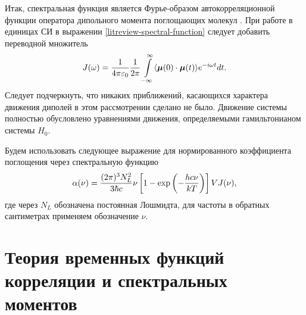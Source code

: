Итак, спектральная функция является Фурье-образом автокорреляционной функции оператора дипольного момента поглощающих молекул \cite{gordon1968}. При работе в единицах СИ в выражении \eqref{litreview-spectral-function} следует добавить переводной множитель
\begin{gather}
    J(\omega) = \frac{1}{4\pi \varepsilon_0} \frac{1}{2\pi} \int\limits_{-\infty}^\infty \langle  \boldsymbol{\mu}(0) \cdot \boldsymbol{\mu}(t)  \rangle e^{-i \omega t} dt. \label{litreview-spectral-function} 
\end{gather}
Следует подчеркнуть, что никаких приближений, касающихся характера движения диполей в этом рассмотрении сделано не было. Движение системы полностью обусловлено уравнениями движения, определяемыми гамильтонианом системы $\hat{H}_0$. \par
Будем использовать следующее выражение для нормированного коэффициента поглощения через спектральную функцию 
\begin{gather}
    \alpha(\nu) = \frac{(2 \pi)^3 N_L^2}{3 \hbar c} \nu \left[ 1 - \exp \left( -\frac{h c \nu}{k T} \right) \right] V J(\nu), \label{part1-absorption-coefficient-definition1}  
\end{gather}
%
где через $N_L$ обозначена постоянная Лошмидта, для частоты в обратных сантиметрах применяем обозначение $\nu$. 

\section{Теория временных функций корреляции и спектральных моментов} \label{section:correlation_functions}

